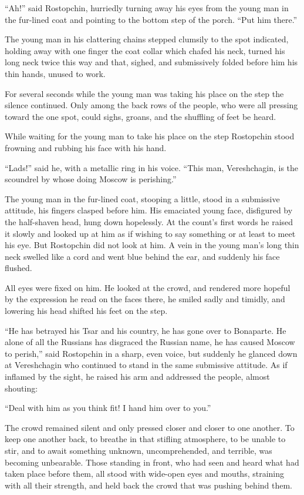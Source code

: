 ``Ah!'' said Rostopchin, hurriedly turning away his eyes from the
young man in the fur-lined coat and pointing to the bottom step
of the porch.  ``Put him there.''

The young man in his clattering chains stepped clumsily to the
spot indicated, holding away with one finger the coat collar
which chafed his neck, turned his long neck twice this way and
that, sighed, and submissively folded before him his thin hands,
unused to work.

For several seconds while the young man was taking his place on
the step the silence continued. Only among the back rows of the
people, who were all pressing toward the one spot, could sighs,
groans, and the shuffling of feet be heard.

While waiting for the young man to take his place on the step
Rostopchin stood frowning and rubbing his face with his hand.

``Lads!'' said he, with a metallic ring in his voice. ``This man,
Vereshchagin, is the scoundrel by whose doing Moscow is
perishing.''

The young man in the fur-lined coat, stooping a little, stood in
a submissive attitude, his fingers clasped before him. His
emaciated young face, disfigured by the half-shaven head, hung
down hopelessly. At the count's first words he raised it slowly
and looked up at him as if wishing to say something or at least
to meet his eye. But Rostopchin did not look at him. A vein in
the young man's long thin neck swelled like a cord and went blue
behind the ear, and suddenly his face flushed.

All eyes were fixed on him. He looked at the crowd, and rendered
more hopeful by the expression he read on the faces there, he
smiled sadly and timidly, and lowering his head shifted his feet
on the step.

``He has betrayed his Tsar and his country, he has gone over to
Bonaparte. He alone of all the Russians has disgraced the Russian
name, he has caused Moscow to perish,'' said Rostopchin in a
sharp, even voice, but suddenly he glanced down at Vereshchagin
who continued to stand in the same submissive attitude. As if
inflamed by the sight, he raised his arm and addressed the
people, almost shouting:

``Deal with him as you think fit! I hand him over to you.''

The crowd remained silent and only pressed closer and closer to
one another. To keep one another back, to breathe in that
stifling atmosphere, to be unable to stir, and to await something
unknown, uncomprehended, and terrible, was becoming
unbearable. Those standing in front, who had seen and heard what
had taken place before them, all stood with wide-open eyes and
mouths, straining with all their strength, and held back the
crowd that was pushing behind them.

